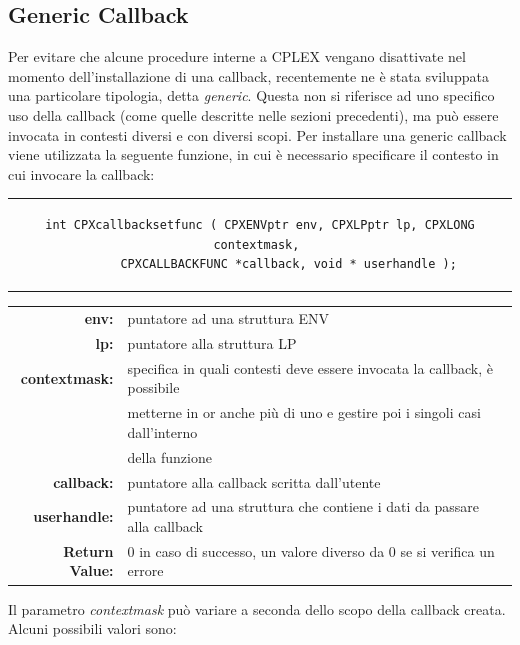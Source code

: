 \subsection{Generic Callback}%
Per evitare che alcune procedure interne a CPLEX vengano disattivate nel momento dell'installazione di una callback, recentemente ne è stata sviluppata una particolare tipologia, detta \textit{generic}. Questa non si riferisce ad uno specifico uso della callback (come quelle descritte nelle sezioni precedenti), ma può essere invocata in contesti diversi e con diversi scopi.
Per installare una generic callback viene utilizzata la seguente funzione, in cui  è necessario specificare il contesto in cui invocare la callback:
\vspace{1 cm}
\begin{center}
\begin{tabular}{c}
\begin{lstlisting}[linewidth=380pt, basicstyle=\footnotesize\sffamily,]    
int CPXcallbacksetfunc ( CPXENVptr env, CPXLPptr lp, CPXLONG contextmask, 
		CPXCALLBACKFUNC *callback, void * userhandle );
\end{lstlisting}
\end{tabular}
\end{center}
\begin{table}[h]
\centering
\begin{tabular}{rl}
\textbf{env:} & {puntatore ad una struttura ENV}\\
\textbf{lp:} & {puntatore alla struttura LP}\\
\textbf{contextmask:} & {specifica in quali contesti deve essere invocata la callback, è possibile }\\
&{metterne in or anche più di uno e gestire poi i singoli casi dall'interno}\\
&{della funzione}\\
\textbf{callback:} & {puntatore alla callback scritta dall'utente} \\
\textbf{userhandle:} & {puntatore ad una struttura che contiene i dati da passare alla callback} \\
\textbf{Return Value:} & {0 in caso di successo, un valore diverso da 0 se si verifica un errore}\\
\end{tabular}
\end{table}
Il parametro \textit{contextmask} può variare a seconda dello scopo della callback creata. Alcuni possibili valori sono:

